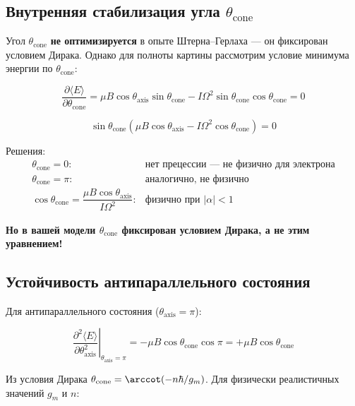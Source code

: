 \documentclass[12pt]{article}
\begin{document}
\subsection{Внутренняя стабилизация угла $\theta_{\text{cone}}$}

Угол $\theta_{\text{cone}}$ \textbf{не оптимизируется} в опыте Штерна–Герлаха — он фиксирован условием Дирака. Однако для полноты картины рассмотрим условие минимума энергии по $\theta_{\text{cone}}$:

\begin{equation}
\frac{\partial \langle E \rangle}{\partial \theta_{\text{cone}}} = \mu B \cos\theta_{\text{axis}} \sin\theta_{\text{cone}} - I \Omega^2 \sin\theta_{\text{cone}} \cos\theta_{\text{cone}} = 0
\label{eq:stationarity_cone}
\end{equation}

\begin{equation}
\sin\theta_{\text{cone}} \left( \mu B \cos\theta_{\text{axis}} - I \Omega^2 \cos\theta_{\text{cone}} \right) = 0
\label{eq:stationarity_cone_factored}
\end{equation}

Решения:
\[
\begin{array}{ll}
\theta_{\text{cone}} = 0: & \text{нет прецессии — не физично для электрона} \\
\theta_{\text{cone}} = \pi: & \text{аналогично, не физично} \\
\cos\theta_{\text{cone}} = \dfrac{\mu B \cos\theta_{\text{axis}}}{I \Omega^2}: & \text{физично при } |\alpha| < 1
\end{array}
\]

\textbf{Но в вашей модели $\theta_{\text{cone}}$ фиксирован условием Дирака, а не этим уравнением!}

\subsection{Устойчивость антипараллельного состояния}

Для антипараллельного состояния ($\theta_{\text{axis}} = \pi$):

\begin{equation}
\left. \frac{\partial^2 \langle E \rangle}{\partial \theta_{\text{axis}}^2} \right|_{\theta_{\text{axis}} = \pi} = -\mu B \cos\theta_{\text{cone}} \cos\pi = +\mu B \cos\theta_{\text{cone}}
\label{eq:second_derivative}
\end{equation}

Из условия Дирака $\theta_{\text{cone}} = \arccot(-n\hbar/g_m)$. Для физически реалистичных значений $g_m$ и $n$:
\end{document}
